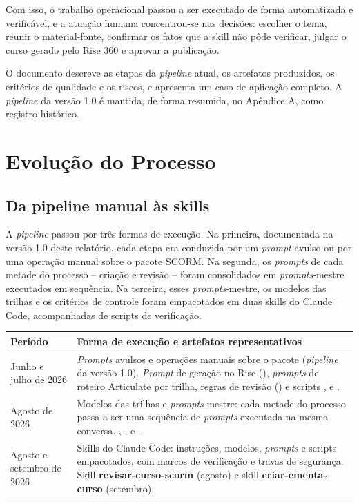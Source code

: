\documentclass[12pt,a4paper]{article}
\newcommand{\skill}[1]{\textsf{\textbf{#1}}}
\begin{document}
Com isso, o trabalho operacional passou a ser executado de forma automatizada e verificável, e a atuação humana concentrou-se nas decisões: escolher o tema, reunir o material-fonte, confirmar os fatos que a skill não pôde verificar, julgar o curso gerado pelo Rise 360 e aprovar a publicação.

O documento descreve as etapas da \textit{pipeline} atual, os artefatos produzidos, os critérios de qualidade e os riscos, e apresenta um caso de aplicação completo. A \textit{pipeline} da versão 1.0 é mantida, de forma resumida, no Apêndice A, como registro histórico.

\section{Evolução do Processo}\label{sec:evolucao}

\subsection{Da pipeline manual às skills}

A \textit{pipeline} passou por três formas de execução. Na primeira, documentada na versão 1.0 deste relatório, cada etapa era conduzida por um \textit{prompt} avulso ou por uma operação manual sobre o pacote SCORM. Na segunda, os \textit{prompts} de cada metade do processo -- criação e revisão -- foram consolidados em \textit{prompts}-mestre executados em sequência. Na terceira, esses \textit{prompts}-mestre, os modelos das trilhas e os critérios de controle foram empacotados em duas skills do Claude Code, acompanhadas de scripts de verificação.

\begingroup\small
\renewcommand{\arraystretch}{1.3}
\begin{longtable}{@{}L{0.20\textwidth}L{0.76\textwidth}@{}}
\toprule
\textbf{Período} & \textbf{Forma de execução e artefatos representativos} \\
\midrule
\endhead
Junho e julho de 2026 &
\textit{Prompts} avulsos e operações manuais sobre o pacote (\textit{pipeline} da versão 1.0). \textit{Prompt} de geração no Rise (), \textit{prompts} de roteiro Articulate por trilha, regras de revisão () e scripts ,  e . \\
\addlinespace
Agosto de 2026 &
Modelos das trilhas e \textit{prompts}-mestre: cada metade do processo passa a ser uma sequência de \textit{prompts} executada na mesma conversa. , ,  e . \\
\addlinespace
Agosto e setembro de 2026 &
Skills do Claude Code: instruções, modelos, \textit{prompts} e scripts empacotados, com marcos de verificação e travas de segurança. Skill \skill{revisar-curso-scorm} (agosto) e skill \skill{criar-ementa-curso} (setembro). \\
\bottomrule
\end{longtable}
\endgroup
\end{document}
